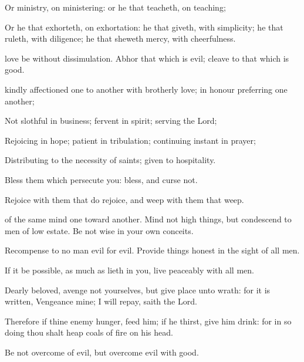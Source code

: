 {Or
ministry,
{}
on
{}
ministering:
or he that
teacheth,
on
teaching;

Or he that
exhorteth,
on
exhortation: he that
giveth,
{}
with
simplicity; he that
ruleth,
with
diligence; he that sheweth
mercy,
with
cheerfulness.


\par }{\PP {}
love be without
dissimulation.
Abhor that which is
evil;
cleave to that which is
good.

 kindly
affectioned
one
to
another with brotherly
love; in
honour
preferring one
another;

Not
slothful in
business;
fervent in
spirit;
serving the
Lord;

Rejoicing in
hope;
patient in
tribulation; continuing
instant in
prayer;

Distributing to the
necessity of
saints; given
to
hospitality.

Bless them which
persecute
you:
bless,
and
curse
not.

Rejoice
with them that do
rejoice,
and
weep
with them that
weep.

of the
same
mind
one
toward
another.
Mind
not high
things,
but
condescend to men of low
estate.
Be
not
wise
in your own
conceits.

Recompense to no
man
evil
for
evil.
Provide things
honest in the sight
of
all
men.

If it be
possible, as much as lieth
in
you, live
peaceably
with
all
men.

Dearly
beloved,
avenge
not
yourselves,
but
{}
give
place unto
wrath:
for it is
written,
Vengeance
{}
mine;
I will
repay,
saith the
Lord.

Therefore
if
thine
enemy
hunger,
feed
him;
if he
thirst,
give
him
drink:
for in
so
doing thou shalt
heap
coals of
fire
on
his
head.

Be
not
overcome
of
evil,
but
overcome
evil
with
good.




\par }
